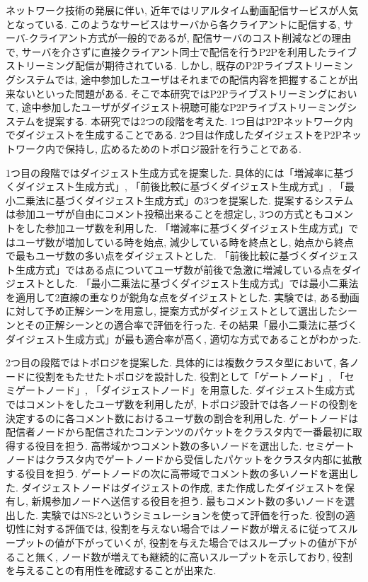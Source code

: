 ネットワーク技術の発展に伴い, 近年ではリアルタイム動画配信サービスが人気となっている. このようなサービスはサーバから各クライアントに配信する, サーバ-クライアント方式が一般的であるが, 配信サーバのコスト削減などの理由で, サーバを介さずに直接クライアント同士で配信を行うP2Pを利用したライブストリーミング配信が期待されている. しかし, 既存のP2Pライブストリーミングシステムでは, 途中参加したユーザはそれまでの配信内容を把握することが出来ないといった問題がある. そこで本研究ではP2Pライブストリーミングにおいて, 途中参加したユーザがダイジェスト視聴可能なP2Pライブストリーミングシステムを提案する. 本研究では2つの段階を考えた. 1つ目はP2Pネットワーク内でダイジェストを生成することである. 2つ目は作成したダイジェストをP2Pネットワーク内で保持し, 広めるためのトポロジ設計を行うことである.

1つ目の段階ではダイジェスト生成方式を提案した. 具体的には「増減率に基づくダイジェスト生成方式」, 「前後比較に基づくダイジェスト生成方式」, 「最小二乗法に基づくダイジェスト生成方式」の3つを提案した. 提案するシステムは参加ユーザが自由にコメント投稿出来ることを想定し, 3つの方式ともコメントをした参加ユーザ数を利用した. 「増減率に基づくダイジェスト生成方式」ではユーザ数が増加している時を始点, 減少している時を終点とし, 始点から終点で最もユーザ数の多い点をダイジェストとした. 「前後比較に基づくダイジェスト生成方式」ではある点についてユーザ数が前後で急激に増減している点をダイジェストとした. 「最小二乗法に基づくダイジェスト生成方式」では最小二乗法を適用して2直線の重なりが鋭角な点をダイジェストとした. 実験では, ある動画に対して予め正解シーンを用意し, 提案方式がダイジェストとして選出したシーンとその正解シーンとの適合率で評価を行った. その結果「最小二乗法に基づくダイジェスト生成方式」が最も適合率が高く, 適切な方式であることがわかった.

2つ目の段階ではトポロジを提案した. 具体的には複数クラスタ型において, 各ノードに役割をもたせたトポロジを設計した. 役割として「ゲートノード」, 「セミゲートノード」, 「ダイジェストノード」を用意した. ダイジェスト生成方式ではコメントをしたユーザ数を利用したが, トポロジ設計では各ノードの役割を決定するのに各コメント数におけるユーザ数の割合を利用した. ゲートノードは配信者ノードから配信されたコンテンツのパケットをクラスタ内で一番最初に取得する役目を担う. 高帯域かつコメント数の多いノードを選出した. セミゲートノードはクラスタ内でゲートノードから受信したパケットをクラスタ内部に拡散する役目を担う. ゲートノードの次に高帯域でコメント数の多いノードを選出した. ダイジェストノードはダイジェストの作成, また作成したダイジェストを保有し, 新規参加ノードへ送信する役目を担う. 最もコメント数の多いノードを選出した. 実験ではNS-2というシミュレーションを使って評価を行った. 役割の適切性に対する評価では, 役割を与えない場合ではノード数が増えるに従ってスループットの値が下がっていくが, 役割を与えた場合ではスループットの値が下がること無く, ノード数が増えても継続的に高いスループットを示しており, 役割を与えることの有用性を確認することが出来た.
